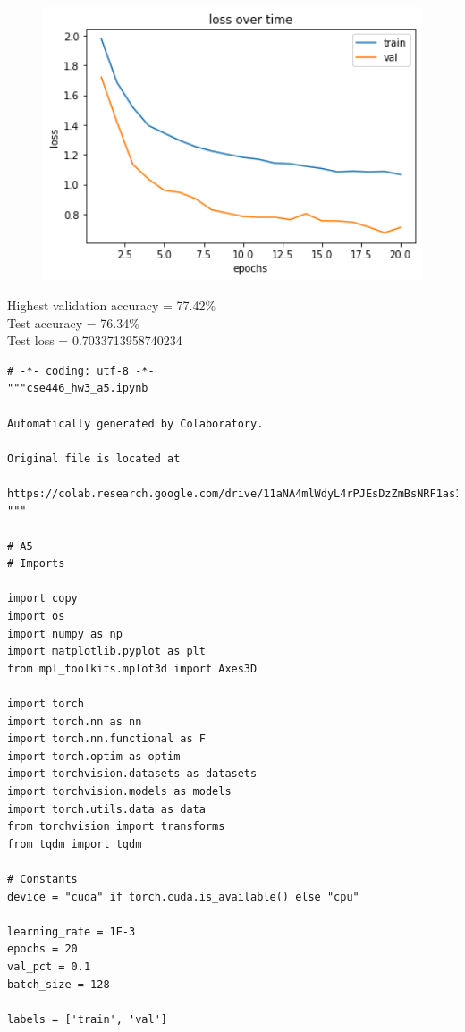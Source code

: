 \documentclass{article}
\newcommand{\1}{\mathbf{1}}
\begin{document}
{\begin{figure}[h]
  \centering
  \includegraphics[width=150mm]{../hw3-code/results/a5_b.png}
\end{figure}

Highest validation accuracy = 77.42\% \\
Test accuracy = 76.34\% \\
Test loss = 0.7033713958740234

\newpage

\begin{verbatim}
# -*- coding: utf-8 -*-
"""cse446_hw3_a5.ipynb

Automatically generated by Colaboratory.

Original file is located at
    https://colab.research.google.com/drive/11aNA4mlWdyL4rPJEsDzZmBsNRF1as1nm
"""

# A5
# Imports

import copy
import os
import numpy as np
import matplotlib.pyplot as plt
from mpl_toolkits.mplot3d import Axes3D

import torch
import torch.nn as nn
import torch.nn.functional as F
import torch.optim as optim
import torchvision.datasets as datasets
import torchvision.models as models
import torch.utils.data as data
from torchvision import transforms
from tqdm import tqdm

# Constants
device = "cuda" if torch.cuda.is_available() else "cpu"

learning_rate = 1E-3
epochs = 20
val_pct = 0.1
batch_size = 128

labels = ['train', 'val']


\end{verbatim}}
\end{document}
